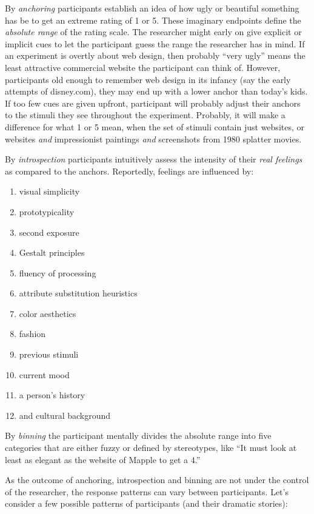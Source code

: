 \documentclass[]{svmono}
\providecommand{\tightlist}{%
  \setlength{\itemsep}{0pt}\setlength{\parskip}{0pt}}
\theoremstyle{definition}
\theoremstyle{definition}
\theoremstyle{definition}
\theoremstyle{remark}
\begin{document}
By \emph{anchoring} participants establish an idea of how ugly or
beautiful something has be to get an extreme rating of 1 or 5. These
imaginary endpoints define the \emph{absolute range} of the rating
scale. The researcher might early on give explicit or implicit cues to
let the participant guess the range the researcher has in mind. If an
experiment is overtly about web design, then probably ``very ugly''
means the least attractive commercial website the participant can think
of. However, participants old enough to remember web design in its
infancy (say the early attempts of disney.com), they may end up with a
lower anchor than today's kids. If too few cues are given upfront,
participant will probably adjust their anchors to the stimuli they see
throughout the experiment. Probably, it will make a difference for what
1 or 5 mean, when the set of stimuli contain just websites, or websites
\emph{and} impressionist paintings \emph{and} screenshots from 1980
splatter movies.

By \emph{introspection} participants intuitively assess the intensity of
their \emph{real feelings} as compared to the anchors. Reportedly,
feelings are influenced by:

\begin{enumerate}
\def\labelenumi{\arabic{enumi}.}
\tightlist
\item
  visual simplicity
\item
  prototypicality
\item
  second exposure
\item
  Gestalt principles
\item
  fluency of processing
\item
  attribute substitution heuristics
\item
  color aesthetics
\item
  fashion
\item
  previous stimuli
\item
  current mood
\item
  a person's history
\item
  and cultural background
\end{enumerate}

By \emph{binning} the participant mentally divides the absolute range
into five categories that are either fuzzy or defined by stereotypes,
like ``It must look at least as elegant as the website of Mapple to get
a 4.''

As the outcome of anchoring, introspection and binning are not under the
control of the researcher, the response patterns can vary between
participants. Let's consider a few possible patterns of participants
(and their dramatic stories):
\end{document}
